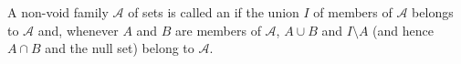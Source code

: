 A non-void family $\mathcal{A}$ of sets is called an  if the union $I$ of members of $\mathcal{A}$ belongs to $\mathcal{A}$ and, whenever $A$ and $B$ are members of $\mathcal{A}$, $A \cup B$ and $I \setminus A$ (and hence $A \cap B$ and the null set) belong to $\mathcal{A}$.
